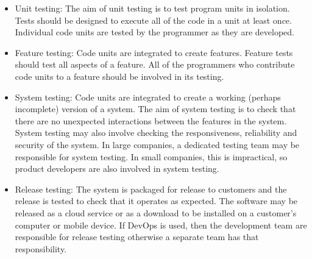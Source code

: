 \documentclass[10pt,a4paper]{report}
\begin{document}
 \begin{itemize}
 	\item Unit testing:	The aim of unit testing is to test program units in isolation. Tests should be designed to execute
 	all of the code in a unit at least once. Individual code units are tested by the programmer as
 	they are developed.
 	\item Feature testing: 	Code units are integrated to create features. Feature tests should test all aspects of a feature.
 	All of the programmers who contribute code units to a feature should be involved in its testing.
 	\item System testing: Code units are integrated to create a working (perhaps incomplete) version of a system. The
 	aim of system testing is to check that there are no unexpected interactions between the
 	features in the system. System testing may also involve checking the responsiveness, reliability
 	and security of the system. In large companies, a dedicated testing team may be responsible
 	for system testing. In small companies, this is impractical, so product developers are also
 	involved in system testing.
 	\item Release testing: The system is packaged for release to customers and the release is tested to check that it
 	operates as expected. The software may be released as a cloud service or as a download to be
 	installed on a customer’s computer or mobile device. If DevOps is used, then the development
 	team are responsible for release testing otherwise a separate team has that responsibility.
 \end{itemize}
\end{document}
